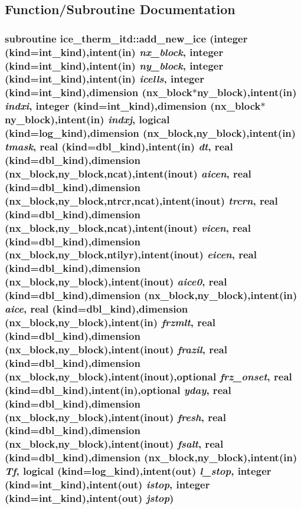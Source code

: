 \subsection{Function/Subroutine Documentation}
\hypertarget{namespaceice__therm__itd_a6c41e380c1a3c0ee4f833a4f31f80de2}{
\subsubsection[{add\_\-new\_\-ice}]{\setlength{\rightskip}{0pt plus 5cm}subroutine ice\_\-therm\_\-itd::add\_\-new\_\-ice (integer (kind=int\_\-kind),intent(in) {\em nx\_\-block}, \/  integer (kind=int\_\-kind),intent(in) {\em ny\_\-block}, \/  integer (kind=int\_\-kind),intent(in) {\em icells}, \/  integer (kind=int\_\-kind),dimension (nx\_\-block$\ast$ny\_\-block),intent(in) {\em indxi}, \/  integer (kind=int\_\-kind),dimension (nx\_\-block$\ast$ny\_\-block),intent(in) {\em indxj}, \/  logical (kind=log\_\-kind),dimension (nx\_\-block,ny\_\-block),intent(in) {\em tmask}, \/  real (kind=dbl\_\-kind),intent(in) {\em dt}, \/  real (kind=dbl\_\-kind),dimension (nx\_\-block,ny\_\-block,ncat),intent(inout) {\em aicen}, \/  real (kind=dbl\_\-kind),dimension (nx\_\-block,ny\_\-block,ntrcr,ncat),intent(inout) {\em trcrn}, \/  real (kind=dbl\_\-kind),dimension (nx\_\-block,ny\_\-block,ncat),intent(inout) {\em vicen}, \/  real (kind=dbl\_\-kind),dimension (nx\_\-block,ny\_\-block,ntilyr),intent(inout) {\em eicen}, \/  real (kind=dbl\_\-kind),dimension (nx\_\-block,ny\_\-block),intent(inout) {\em aice0}, \/  real (kind=dbl\_\-kind),dimension (nx\_\-block,ny\_\-block),intent(in) {\em aice}, \/  real (kind=dbl\_\-kind),dimension (nx\_\-block,ny\_\-block),intent(in) {\em frzmlt}, \/  real (kind=dbl\_\-kind),dimension (nx\_\-block,ny\_\-block),intent(inout) {\em frazil}, \/  real (kind=dbl\_\-kind),dimension (nx\_\-block,ny\_\-block),intent(inout),optional {\em frz\_\-onset}, \/  real (kind=dbl\_\-kind),intent(in),optional {\em yday}, \/  real (kind=dbl\_\-kind),dimension (nx\_\-block,ny\_\-block),intent(inout) {\em fresh}, \/  real (kind=dbl\_\-kind),dimension (nx\_\-block,ny\_\-block),intent(inout) {\em fsalt}, \/  real (kind=dbl\_\-kind),dimension (nx\_\-block,ny\_\-block),intent(in) {\em Tf}, \/  logical (kind=log\_\-kind),intent(out) {\em l\_\-stop}, \/  integer (kind=int\_\-kind),intent(out) {\em istop}, \/  integer (kind=int\_\-kind),intent(out) {\em jstop})}}
\label{namespaceice__therm__itd_a6c41e380c1a3c0ee4f833a4f31f80de2}


